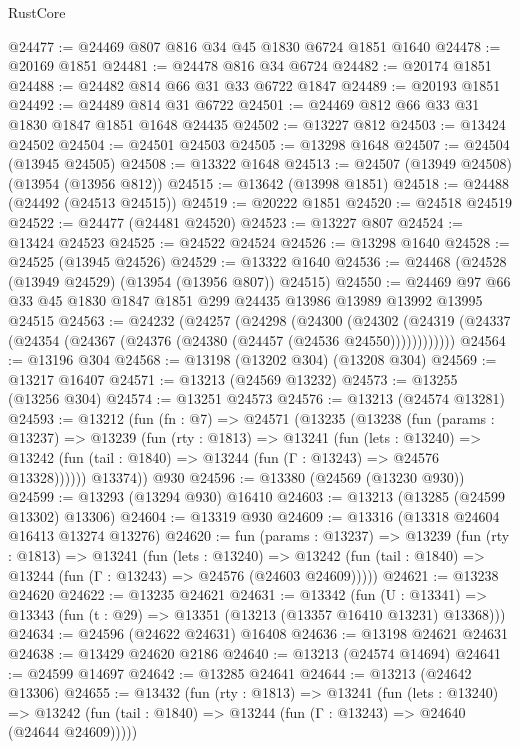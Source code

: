 \begin{lexlean}{RustCore}
\begin{coremodule}
@24477 := @24469 @807 @816 @34 @45 @1830 @6724 @1851 @1640
@24478 := @20169 @1851
@24481 := @24478 @816 @34 @6724
@24482 := @20174 @1851
@24488 := @24482 @814 @66 @31 @33 @6722 @1847
@24489 := @20193 @1851
@24492 := @24489 @814 @31 @6722
@24501 := @24469 @812 @66 @33 @31 @1830 @1847 @1851 @1648 @24435
@24502 := @13227 @812
@24503 := @13424 @24502
@24504 := @24501 @24503
@24505 := @13298 @1648
@24507 := @24504 (@13945 @24505)
@24508 := @13322 @1648
@24513 := @24507 (@13949 @24508) (@13954 (@13956 @812))
@24515 := @13642 (@13998 @1851)
@24518 := @24488 (@24492 (@24513 @24515))
@24519 := @20222 @1851
@24520 := @24518 @24519
@24522 := @24477 (@24481 @24520)
@24523 := @13227 @807
@24524 := @13424 @24523
@24525 := @24522 @24524
@24526 := @13298 @1640
@24528 := @24525 (@13945 @24526)
@24529 := @13322 @1640
@24536 := @24468 (@24528 (@13949 @24529) (@13954 (@13956 @807)) @24515)
@24550 := @24469 @97 @66 @33 @45 @1830 @1847 @1851 @299 @24435 @13986 @13989 @13992 @13995 @24515
@24563 := @24232
    (@24257
      (@24298
        (@24300
          (@24302 (@24319 (@24337 (@24354 (@24367 (@24376 (@24380 (@24457 (@24536 @24550))))))))))))
@24564 := @13196 @304
@24568 := @13198 (@13202 @304) (@13208 @304)
@24569 := @13217 @16407
@24571 := @13213 (@24569 @13232)
@24573 := @13255 (@13256 @304)
@24574 := @13251 @24573
@24576 := @13213 (@24574 @13281)
@24593 := @13212
    (fun (fn : @7) =>
    @24571
      (@13235
        (@13238
          (fun (params : @13237) =>
          @13239
            (fun (rty : @1813) =>
            @13241
              (fun (lets : @13240) =>
              @13242 (fun (tail : @1840) => @13244 (fun (Γ : @13243) => @24576 @13328))))))
        @13374))
    @930
@24596 := @13380 (@24569 (@13230 @930))
@24599 := @13293 (@13294 @930) @16410
@24603 := @13213 (@13285 (@24599 @13302) @13306)
@24604 := @13319 @930
@24609 := @13316 (@13318 @24604 @16413 @13274 @13276)
@24620 := fun (params : @13237) =>
  @13239
    (fun (rty : @1813) =>
    @13241
      (fun (lets : @13240) =>
      @13242 (fun (tail : @1840) => @13244 (fun (Γ : @13243) => @24576 (@24603 @24609)))))
@24621 := @13238 @24620
@24622 := @13235 @24621
@24631 := @13342
    (fun (U : @13341) => @13343 (fun (t : @29) => @13351 (@13213 (@13357 @16410 @13231) @13368)))
@24634 := @24596 (@24622 @24631) @16408
@24636 := @13198 @24621 @24631
@24638 := @13429 @24620 @2186
@24640 := @13213 (@24574 @14694)
@24641 := @24599 @14697
@24642 := @13285 @24641
@24644 := @13213 (@24642 @13306)
@24655 := @13432
    (fun (rty : @1813) =>
    @13241
      (fun (lets : @13240) =>
      @13242 (fun (tail : @1840) => @13244 (fun (Γ : @13243) => @24640 (@24644 @24609)))))

\end{coremodule}
\end{lexlean}
